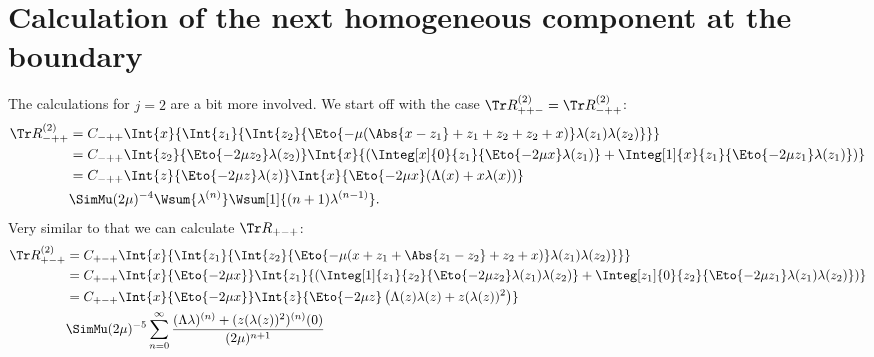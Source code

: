 \section{Calculation of the next homogeneous component at the boundary}


The calculations for $j = 2$ are a bit more involved. We start off with the case
$\Tr R^{(2)}_{++-} =  \Tr R^{(2)}_{-++}$:
\begin{align*}
  \Tr R^{(2)}_{-++} &= C_{-++} \Int{x}{
  \Int{z_1}{
    \Int{z_2}{
      \Eto{-\mu(\Abs{x-z_1} + z_1 + z_2 + z_2 + x)}
      \lambda(z_1)\lambda(z_2)
    }
  }
  } \\
  &= C_{-++} \Int{z_2}{\Eto{-2\mu z_2}\lambda(z_2)}
  \Int{x}{
    \left(
    \Integ[x]{0}{z_1}{
      \Eto{-2\mu x}\lambda(z_1)
    }
    + \Integ[1]{x}{z_1}{
      \Eto{-2\mu z_1}\lambda(z_1)
    }
    \right)
  } \\
  &= C_{-++} \Int{z}{\Eto{-2\mu z}\lambda(z)}
  \Int{x}{\Eto{-2\mu x}(\Lambda(x) + x\lambda(x))} \\
  &\SimMu (2\mu)^{-4} \Wsum{\lambda^{(n)}} \Wsum[1]{(n+1)\lambda^{(n-1)}}.
\end{align*}
Very similar to that we can calculate $\Tr R_{+-+}$:
\begin{align*}
  \Tr R_{+-+}^{(2)} &= C_{+-+} \Int{x}{
    \Int{z_1}{
      \Int{z_2}{
        \Eto{-\mu(x+z_1 + \Abs{z_1 - z_2} + z_2 + x)}
        \lambda(z_1)\lambda(z_2)
      }
    }
  } \\
  &= C_{+-+} \Int{x}{\Eto{-2\mu x}}
  \Int{z_1}{
    \left(
    \Integ[1]{z_1}{z_2}{
      \Eto{-2\mu z_2}\lambda(z_1)\lambda(z_2)
    }
    + \Integ[z_1]{0}{z_2}{
      \Eto{-2\mu z_1}\lambda(z_1)\lambda(z_2)
    }
    \right)
  } \\
  &= C_{+-+} \Int{x}{\Eto{-2\mu x}}
    \Int{z}{
      \Eto{-2\mu z}\left(
        \Lambda(z)\lambda(z) + z (\lambda(z))^2
      \right)
    } \\
    &\SimMu (2\mu)^{-5} \sum_{n=0}^\infty \frac{(\Lambda\lambda)^{(n)} +
  (z(\lambda(z))^2)^{(n)}(0)}{(2\mu)^{n+1}}
\end{align*}

